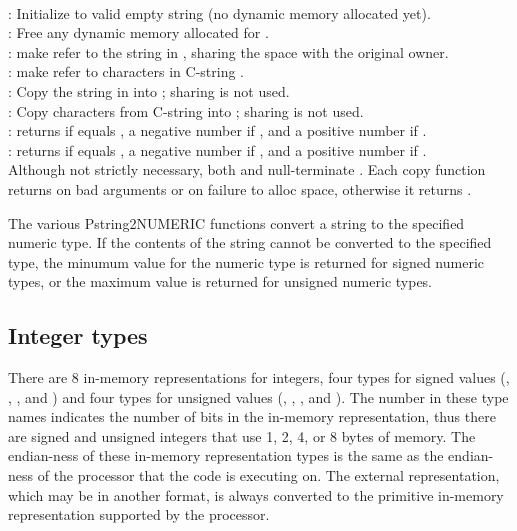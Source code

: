 \mbox{}\\[1ex]
: Initialize  to valid empty string (no dynamic memory allocated yet).\\[1ex]
: Free any dynamic memory allocated for .\\[1ex]
: make  refer to the string in ,
sharing the space with the original owner.\\[1ex]
: make  refer to  characters in C-string .\\[1ex]
: Copy the string in  into ; sharing is not used.\\[1ex]
: Copy  characters from C-string  into ; sharing is not used.\\[1ex]
: returns  if  equals , a negative number if ,
and a positive number if .\\[1ex]
: returns  if  equals , a negative number if ,
and a positive number if .\\[1ex]

Although not strictly necessary, both  and
 null-terminate .  Each copy
function returns  on bad arguments or on failure to alloc
space, otherwise it returns .

The various Pstring2NUMERIC functions convert a string to the
specified numeric type.  If the contents of the string cannot be
converted to the specified type, the minumum value for the numeric
type is returned for signed numeric types, or the maximum value is
returned for unsigned numeric types.

\subsection{Integer types}

There are 8 in-memory representations for integers, four types for
signed values (, , , and )
and four types for unsigned values (, , , and ).
The number in these type names indicates the number of bits in the in-memory representation,
thus there are signed and unsigned integers that use 1, 2, 4, or 8 bytes of memory.
The endian-ness of these in-memory representation types is the same as the
endian-ness of the processor that the code is executing on. 
The external representation, which may be in another format, is always converted
to the primitive in-memory representation supported by the processor.


